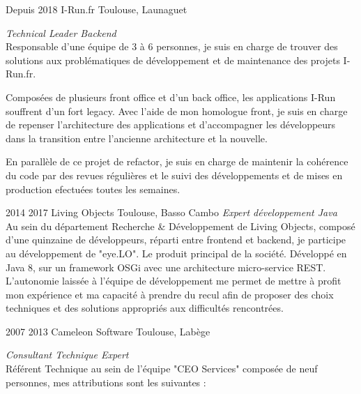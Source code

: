 \documentclass{friggeri-cv} 	%
\begin{document}
\begin{entrylist}
\entry
{Depuis 2018}
{I-Run.fr}
{Toulouse, Launaguet}
{\vspace{0.2cm}\emph{Technical Leader Backend} \\
Responsable d’une équipe de 3 à 6 personnes, je suis en charge de trouver des solutions aux problématiques de développement 
et de maintenance des projets I-Run.fr.

Composées de plusieurs front office et d’un back office, les applications I-Run souffrent d’un fort legacy. 
Avec l’aide de mon homologue front, je suis en charge de repenser l’architecture des applications et d’accompagner les 
développeurs dans la transition entre l’ancienne architecture et la nouvelle.

En parallèle de ce projet de refactor, je suis en charge de maintenir la cohérence du code par des revues régulières 
et le suivi des développements et de mises en production efectuées toutes les semaines.
\\}

\entry
{2014  2017}
{Living Objects}
{Toulouse, Basso Cambo}
{\vspace{0.2cm}\emph{Expert développement Java} \\
Au sein du département Recherche \& Développement de Living Objects, composé d’une quinzaine de développeurs,
réparti entre frontend et backend, je participe au développement de "eye.LO". Le produit principal de la société. Développé
en Java 8, sur un framework OSGi avec une architecture micro-service REST.\\

L’autonomie laissée à l’équipe de développement me permet de mettre à profit mon expérience et ma capacité à prendre du recul afin de proposer des choix techniques et des solutions appropriés aux difficultés rencontrées.
\\}

\entry
{2007  2013}
{Cameleon Software}
{Toulouse, Labège}
{\vspace{0.2cm}\emph{Consultant Technique Expert} \\
Référent Technique au sein de l’équipe "CEO Services" composée de neuf personnes, mes attributions sont les suivantes :

}
\end{entrylist}
\end{document}
